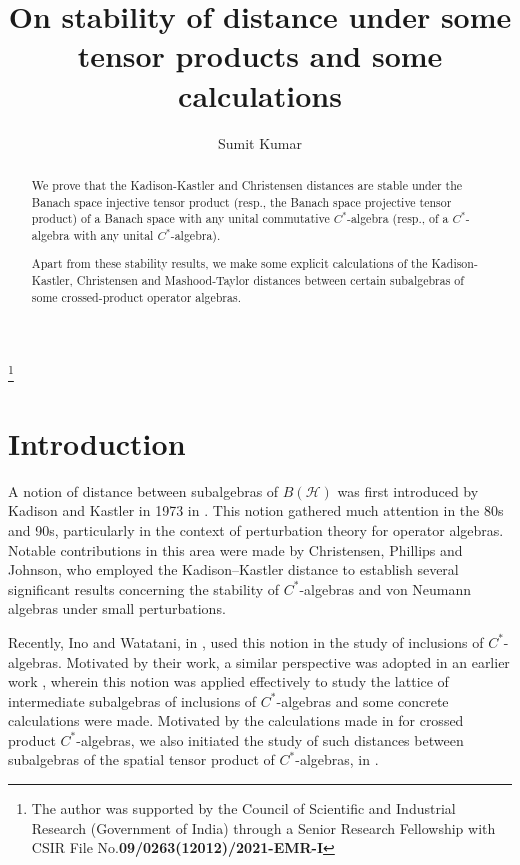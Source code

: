 \documentclass{amsart}
\numberwithin{equation}{section}
\newcommand{\mcal}{\mathcal}
\newcommand{\1}{\mathbf{1}}
\begin{document}
\title[{\tiny Distances between subalgebras
   of operator algebras}]{
   On stability of distance under some tensor products and some calculations
}

 \author[S Kumar]{Sumit Kumar} \address{School of Physical Sciences, Jawaharlal Nehru University, New Delhi, India}



\thanks{The author was  supported
  by the Council of Scientific and Industrial Research (Government
  of India) through a Senior Research Fellowship with
  CSIR File No.{\bf 09/0263(12012)/2021-EMR-I}}
\maketitle

\begin{abstract}
We prove that the Kadison-Kastler and Christensen distances are stable
under the Banach space injective tensor product (resp., the
Banach space projective tensor product) of a Banach space with any
unital commutative $C^*$-algebra (resp., of a $C^*$-algebra with any
unital $C^*$-algebra).

Apart from these stability results, we make some explicit calculations
of the Kadison-Kastler, Christensen and Mashood-Taylor distances
between certain subalgebras of some crossed-product operator algebras.
  \end{abstract}
\section{Introduction}
A notion of distance between subalgebras of $B(\mcal{H})$ was first
introduced by Kadison and Kastler in 1973 in \cite{KK}.  This notion
gathered much attention in the 80s and 90s, particularly in the
context of perturbation theory for operator algebras.  Notable
contributions in this area were made by Christensen, Phillips and
Johnson, who employed the Kadison–Kastler distance to establish
several significant results concerning the stability of $C^*$-algebras
and von Neumann algebras under small perturbations.

Recently, Ino and Watatani, in \cite{IW}, used this notion in the
study of inclusions of $C^*$-algebras. Motivated by their work, a
similar perspective was adopted in an earlier work \cite{GK}, wherein
this notion was applied effectively to study the lattice of
intermediate subalgebras of inclusions of $C^*$-algebras and some
concrete calculations were made. Motivated by the calculations made in
\cite{GK} for crossed product $C^*$-algebras, we also initiated the study of
such distances between subalgebras of the spatial tensor product of
$C^*$-algebras, in \cite{GK2}.
\end{document}
